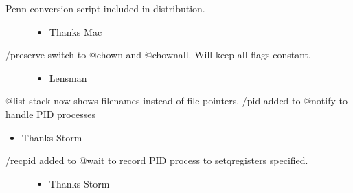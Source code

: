 \documentclass[letterpaper,10pt,english]{sphinxmanual}
\begin{document}
\begin{description}
\begin{itemize}
\end{itemize}

\item[{Penn conversion script included in distribution.}] \leavevmode\begin{itemize}
\item {} 
\sphinxAtStartPar
Thanks Mac

\end{itemize}

\item[{/preserve switch to @chown and @chownall.  Will keep all flags constant.}] \leavevmode\begin{itemize}
\item {} 
\sphinxAtStartPar
Lensman

\end{itemize}

\end{description}

\sphinxAtStartPar
@list stack now shows filenames instead of file pointers.
/pid added to @notify to handle PID processes
\begin{itemize}
\item {} 
\sphinxAtStartPar
Thanks Storm

\end{itemize}
\begin{description}
\item[{/recpid added to @wait to record PID process to setq\sphinxhyphen{}registers specified.}] \leavevmode\begin{itemize}
\item {} 
\sphinxAtStartPar
Thanks Storm

\end{itemize}

\end{description}
\end{document}
